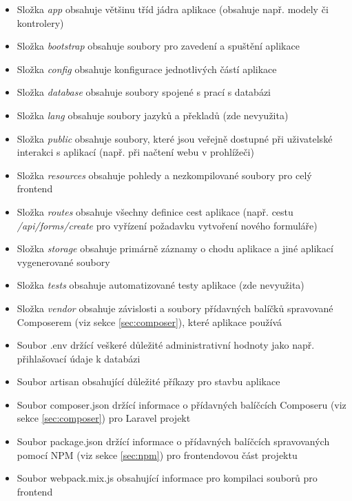 	\begin{itemize}
		\item Složka \textit{app} obsahuje většinu tříd jádra aplikace (obsahuje např. modely či kontrolery) \cite{LaravelDir}
		\item Složka \textit{bootstrap} obsahuje soubory pro zavedení a spuštění aplikace \cite{LaravelDir}
		\item Složka \textit{config} obsahuje konfigurace jednotlivých částí aplikace \cite{LaravelDir}
		\item Složka \textit{database} obsahuje soubory spojené s prací s databázi \cite{LaravelDir}
		\item Složka \textit{lang} obsahuje soubory jazyků a překladů (zde nevyužita) \cite{LaravelDir}
		\item Složka \textit{public} obsahuje soubory, které jsou veřejně dostupné při uživatelské interakci s aplikací (např. při načtení webu v prohlížeči) \cite{LaravelDir}
		\item Složka \textit{resources} obsahuje pohledy a nezkompilované soubory pro celý frontend \cite{LaravelDir}
		\item Složka \textit{routes} obsahuje všechny definice cest aplikace (např. cestu \textit{/api/forms/create} pro vyřízení požadavku vytvoření nového formuláře) \cite{LaravelDir}
		\item Složka \textit{storage} obsahuje primárně záznamy o chodu aplikace a jiné aplikací vygenerované soubory \cite{LaravelDir}
		\item Složka \textit{tests} obsahuje automatizované testy aplikace (zde nevyužita) \cite{LaravelDir}
		\item Složka \textit{vendor} obsahuje závislosti a soubory přídavných balíčků spravované Composerem (viz sekce \ref{sec:composer}), které aplikace používá \cite{LaravelDir} 
		\item Soubor .env držící veškeré důležité administrativní hodnoty jako např. přihlašovací údaje k databázi
		\item Soubor artisan obsahující důležité příkazy pro stavbu aplikace \cite{LaravelArtisan} 
		\item Soubor composer.json držící informace o přídavných balíčcích Composeru (viz sekce \ref{sec:composer}) pro Laravel projekt \cite{ComposerpJSON}
		\item Soubor package.json držící informace o přídavných balíčcích spravovaných pomocí NPM (viz sekce \ref{sec:npm}) pro frontendovou část projektu \cite{NPMpJSON}
		\item Soubor webpack.mix.js obsahující informace pro kompilaci souborů pro frontend \cite{LaravelJSCSS}
	\end{itemize}

